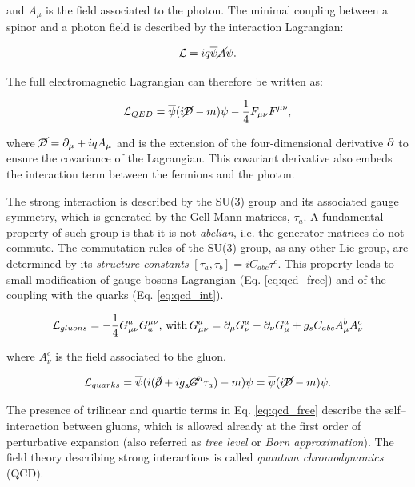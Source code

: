 and $A_{\mu}$ is the field associated to the photon.
The minimal coupling between a spinor and a photon field is described by the interaction Lagrangian:

\begin{equation}
\mathcal{L} = iq \overline{\psi} \cancel{A} \psi.
\end{equation}

The full electromagnetic Lagrangian can therefore be written as:

\begin{equation}
\mathcal{L}_{QED} = \overline{\psi}(i\cancel{\mathcal{D}} - m)\psi - \dfrac{1}{4} F_{\mu\nu} F^{\mu\nu},
\end{equation}

where $\cancel{\mathcal{D}} = \partial_\mu + i q A_\mu$ and is the extension of the four-dimensional derivative $\partial$ to ensure the covariance of the Lagrangian. This covariant derivative also embeds the interaction term between the fermions and the photon.

The strong interaction is described by the SU(3) group and its associated gauge symmetry, which is generated by the Gell-Mann matrices, $\tau_a$. A fundamental property of such group is that it is not \emph{abelian}, i.e. the generator matrices do not commute. The commutation rules of the SU(3) group, as any other Lie group, are determined by its \emph{structure constants} $[\tau_a, \tau_b] = i C_{abc} \tau^c$. This property leads to small modification of gauge bosons Lagrangian (Eq. \ref{eq:qcd_free}) and of the coupling with the quarks (Eq. \ref{eq:qcd_int}).

\begin{equation}
\mathcal{L}_{gluons} = - \dfrac{1}{4} G^{a}_{\mu\nu}  G_{a}^{\mu\nu}, \, \mathrm{with} \, G^{a}_{\mu\nu} = \partial_\mu G^a_\nu - \partial_\nu G^a_\mu + g_s C_{abc} A^b_\mu A^c_\nu
\label{eq:qcd_free}
\end{equation}

where $A^c_\nu$ is the field associated to the gluon.

\begin{equation}
\mathcal{L}_{quarks} = \overline{\psi} ( i (\cancel{\partial} + i g_s \cancel{G}^a \tau_a) - m ) \psi = \overline{\psi} ( i \cancel{\mathcal{D}} - m ) \psi.
\label{eq:qcd_int}
\end{equation}

The presence of trilinear and quartic terms in Eq. \ref{eq:qcd_free} describe the self--interaction between gluons, which is allowed already at the first order of perturbative expansion (also referred as \emph{tree level} or \emph{Born approximation}). The field theory describing strong interactions is called \emph{quantum chromodynamics} (QCD).

